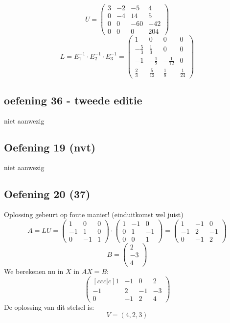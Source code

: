 \documentclass[lineaire_algebra_oplossingen.tex]{subfiles}
\begin{document}
\[ U = 
\begin{pmatrix}
3 & -2 & -5 & 4\\
0 & -4 & 14 & 5\\
0 & 0 & -60 & -42\\
0 & 0 & 0 & 204
\end{pmatrix}
\]
\[ L = E_1^{-1} \cdot E_2^{-1} \cdot E_3^{-1}
= \begin{pmatrix}
1 & 0 & 0 & 0\\
-\frac{5}{3} & \frac{1}{3} & 0 & 0\\
-1 & -\frac{1}{2} & -\frac{1}{12} & 0\\
\frac{2}{3} & \frac{5}{12} & \frac{1}{8} & \frac{1}{24}
\end{pmatrix}
\]

\subsection{oefening 36 - tweede editie}
niet aanwezig 
\subsection{Oefening 19 (nvt)}
niet aanwezig 

\subsection{Oefening 20 (37)}
Oplossing gebeurt op foute manier! (einduitkomst wel juist) 
$$ A = LU = \begin{pmatrix}
1 & 0 & 0\\
-1 & 1 & 0\\
0 & -1 & 1
\end{pmatrix}
\cdot \begin{pmatrix}
1 & -1 & 0\\
0 & 1 & -1\\
0 & 0 & 1
\end{pmatrix}
=
\begin{pmatrix}
1 & -1 & 0\\
-1 & 2 & -1\\
0 & -1 & 2
\end{pmatrix}
$$
$$B = \begin{pmatrix}
2\\
-3\\
4
\end{pmatrix}
$$
We berekenen nu in $X$ in $AX = B$:
$$
\begin{pmatrix}[ccc|c]
1 & -1 & 0 & 2\\
-1 & 2 & -1 & -3\\
0 & -1 & 2 & 4
\end{pmatrix}
$$
De oplossing van dit stelsel is:\\
$$V = {(4,2,3)}$$
\end{document}
